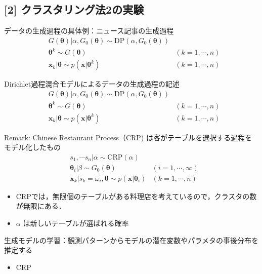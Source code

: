 \documentclass[10pt,fleqn]{beamer}
\begin{document}
    \subsection{[2] クラスタリング法2の実験}
    \begin{frame}{データの生成過程の具体例：ニュース記事の生成過程}
        \begin{align}
            &G(\bm \theta) | \alpha, G_0(\bm \theta) \sim \mathrm{DP}(\alpha, G_0(\bm \theta)) \tag{12.1}\\
            &\bm \theta^k  \sim G(\bm \theta) & (k = 1,\cdots,n) \tag{12.2}\\
            &\mathbf x_k|\bm\theta \sim p(\mathbf x|\bm \theta^k) & (k = 1,\cdots,n) \tag{12.3}
        \end{align}
    \end{frame}
    \begin{frame}{Dirichlet過程混合モデルによるデータの生成過程の記述}
        \begin{align}
            &G(\bm \theta) | \alpha, G_0(\bm \theta) \sim \mathrm{DP}(\alpha, G_0(\bm \theta)) \tag{12.1}\\
            &\bm \theta^k  \sim G(\bm \theta) & (k = 1,\cdots,n) \tag{12.2}\\
            &\mathbf x_k|\bm\theta \sim p(\mathbf x|\bm \theta^k) & (k = 1,\cdots,n) \tag{12.3}
        \end{align}
    \end{frame}
    \begin{frame}{Remark: Chinese Restaurant Process（CRP) は客がテーブルを選択する過程をモデル化したもの}
        \begin{align}
            &s_1,\cdots s_n| \alpha \sim \mathrm{CRP}(\alpha) \tag{12.4}\\
            &\bm \theta_i | \beta \sim G_0(\bm \theta) & (i = 1,\cdots,\infty) \tag{12.5}\\
            &\mathbf x_k|s_k = \omega_i,\bm\theta \sim p(\mathbf x|\bm \theta_i) & (k = 1,\cdots,n) \tag{12.6}
        \end{align}
        \begin{itemize}
            \item CRPでは，無限個のテーブルがある料理店を考えているので，クラスタの数が無限にある．
            \item $\alpha$ は新しいテーブルが選ばれる確率
        \end{itemize}
    \end{frame}
    \begin{frame}{生成モデルの学習：観測パターンからモデルの潜在変数やパラメタの事後分布を推定する}
        \begin{itemize}
            \item CRP
        \end{itemize}
    \end{frame}
\end{document}
